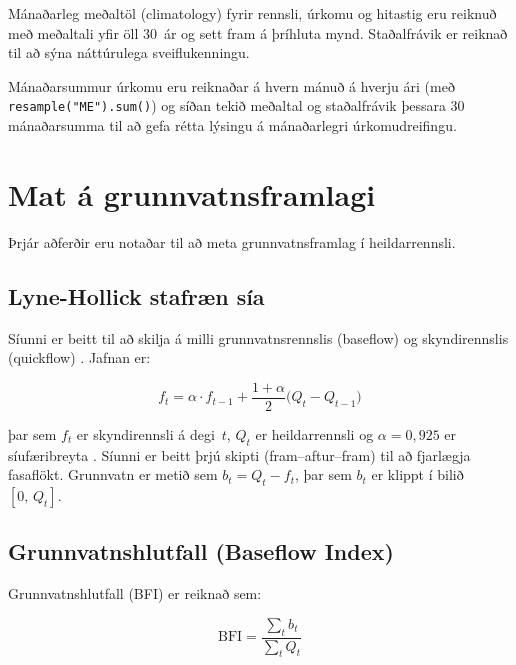 \documentclass[12pt, a4paper]{article}
\begin{document}
Mánaðarleg meðaltöl (climatology) fyrir rennsli, úrkomu og hitastig eru reiknuð
með meðaltali yfir öll 30~ár og sett fram á þríhluta mynd. Staðalfrávik er
reiknað til að sýna náttúrulega sveiflukenningu.

Mánaðarsummur úrkomu eru reiknaðar á hvern mánuð á hverju ári
(með \texttt{resample("ME").sum()}) og síðan tekið meðaltal og staðalfrávik
þessara 30 mánaðarsumma til að gefa rétta lýsingu á mánaðarlegri úrkomudreifingu.

\section{Mat á grunnvatnsframlagi}

Þrjár aðferðir eru notaðar til að meta grunnvatnsframlag í heildarrennsli.

\subsection{Lyne-Hollick stafræn sía}

Síunni er beitt til að skilja á milli grunnvatnsrennslis (baseflow) og
skyndirennslis (quickflow) \cite{Ladson2013}. Jafnan er:

\begin{equation}
    f_t = \alpha \cdot f_{t-1} + \frac{1+\alpha}{2}\bigl(Q_t - Q_{t-1}\bigr)
    \label{eq:lyne-hollick}
\end{equation}

þar sem $f_t$ er skyndirennsli á degi~$t$, $Q_t$ er heildarrennsli og
$\alpha = 0{,}925$ er síufæribreyta \cite{Ladson2013}.
Síunni er beitt þrjú skipti (fram--aftur--fram) til að fjarlægja fasaflökt.
Grunnvatn er metið sem $b_t = Q_t - f_t$, þar sem $b_t$ er klippt í bilið
$[0,\, Q_t]$.

\subsection{Grunnvatnshlutfall (Baseflow Index)}

Grunnvatnshlutfall (BFI) er reiknað sem:

\begin{equation}
    \mathrm{BFI} = \frac{\displaystyle\sum_{t} b_t}{\displaystyle\sum_{t} Q_t}
    \label{eq:bfi}
\end{equation}
\end{document}
